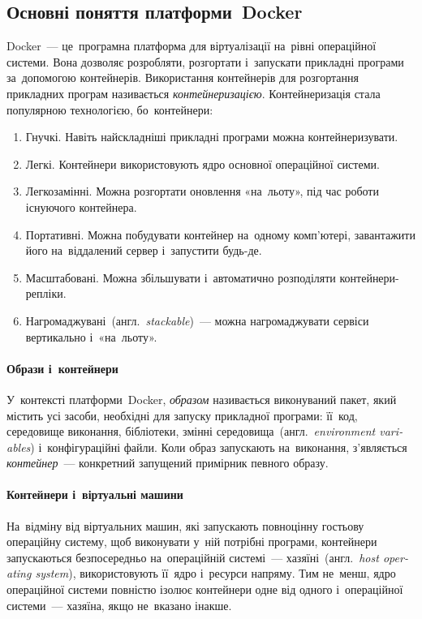 \documentclass[
	a4paper,
	oneside,
	BCOR = 10mm,
	DIV = 12,
	12pt,
	headings = normal,
]{scrartcl}
\newcommand{\transeng}[1]{{англ.}~\textit{\textenglish{#1}}}
\begin{document}
		\subsection{Основні поняття платформи~\textenglish{Docker}}
			\label{ssec:docker-main-concepts}
			\textenglish{Docker}~— це~програмна платформа для віртуалізації на~рівні операційної системи. Вона дозволяє розробляти, розгортати і~запускати прикладні програми за~допомогою контейнерів. Використання контейнерів для розгортання прикладних програм називається \emph{контейнеризацією}. Контейнеризація стала популярною технологією, бо~контейнери:
			\begin{enumerate}
				\item Гнучкі. Навіть найскладніші прикладні програми можна контейнеризувати.
				\item Легкі. Контейнери використовують ядро основної операційної системи.
				\item Легкозамінні. Можна розгортати оновлення «на~льоту», під час роботи існуючого контейнера.
				\item Портативні. Можна побудувати контейнер на~одному комп'ютері, завантажити його на~віддалений сервер і~запустити будь-де.
				\item Масштабовані. Можна збільшувати і~автоматично розподіляти кон\-тей\-не\-ри-ре\-плі\-ки.
				\item Нагромаджувані~(\transeng{stackable})~— можна нагромаджувати сервіси вертикально і~«на~льоту».
			\end{enumerate}

			\paragraph{Образи і~контейнери}
				У~контексті платформи~\textenglish{Docker}, \emph{образом} називається виконуваний пакет, який містить усі засоби, необхідні для запуску прикладної програми: її~код, середовище виконання, бібліотеки, змінні середовища~(\transeng{environment variables}) і~конфігураційні файли. Коли образ запускають на~виконання, з'являється \emph{контейнер}~— конкретний запущений примірник певного образу.

			\paragraph{Контейнери і~віртуальні машини}
				На~відміну від віртуальних машин, які запускають повноцінну гостьову операційну систему, щоб виконувати у~ній потрібні програми, контейнери запускаються безпосередньо на~операційній системі~— хазяїні~(\transeng{host operating system}), використовують її~ядро і~ресурси напряму. Тим не~менш, ядро операційної системи повністю ізолює контейнери одне від одного і~операційної системи~— хазяїна, якщо не~вказано інакше.
\end{document}
